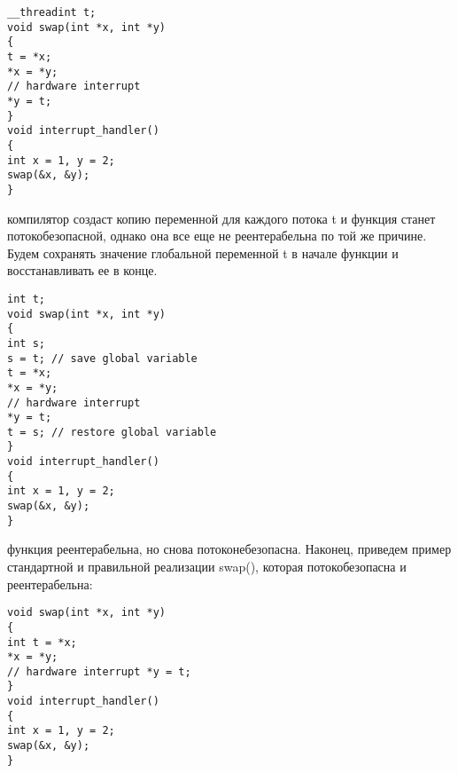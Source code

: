 {	\begin{verbatim}__threadint t;
void swap(int *x, int *y)
{
t = *x;
*x = *y;
// hardware interrupt
*y = t;
}
void interrupt_handler()
{
int x = 1, y = 2;
swap(&x, &y);
}\end{verbatim}
	 компилятор создаст копию переменной для каждого потока t и функция станет потокобезопасной, однако она все еще не реентерабельна по той же причине. Будем сохранять значение глобальной переменной t в начале функции и восстанавливать ее в конце.
	\begin{verbatim}int t;
void swap(int *x, int *y)
{
int s;
s = t; // save global variable
t = *x;
*x = *y;
// hardware interrupt
*y = t;
t = s; // restore global variable
}
void interrupt_handler()
{
int x = 1, y = 2;
swap(&x, &y);
}\end{verbatim}
	 функция реентерабельна, но снова потоконебезопасна. Наконец, приведем пример стандартной и правильной реализации swap(), которая потокобезопасна и реентерабельна:
	\begin{verbatim}void swap(int *x, int *y)
{
int t = *x;
*x = *y;
// hardware interrupt *y = t;
}
void interrupt_handler()
{
int x = 1, y = 2;
swap(&x, &y);
}\end{verbatim}

}